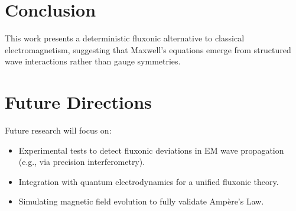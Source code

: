 \documentclass{article}
\begin{document}
\section{Conclusion}
This work presents a deterministic fluxonic alternative to classical electromagnetism, suggesting that Maxwell’s equations emerge from structured wave interactions rather than gauge symmetries.

\section{Future Directions}
Future research will focus on:
\begin{itemize}
    \item Experimental tests to detect fluxonic deviations in EM wave propagation (e.g., via precision interferometry).
    \item Integration with quantum electrodynamics for a unified fluxonic theory.
    \item Simulating magnetic field evolution to fully validate Ampère’s Law.
\end{itemize}
\end{document}
